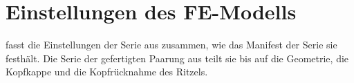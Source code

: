 \section{Einstellungen des FE-Modells}
\label{sec:anhang_c}

 fasst die Einstellungen der Serie aus  zusammen, wie das Manifest der Serie sie festhält. Die Serie der gefertigten Paarung aus  teilt sie bis auf die Geometrie, die Kopfkappe und die Kopfrücknahme des Ritzels.


